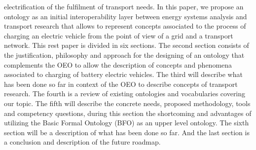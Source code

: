 electrification of the fulfilment of transport needs. In this paper, we propose
an ontology as an initial interoperability layer between energy systems
analysis and transport research that allows to represent concepts associated to
the process of charging an electric vehicle from the point of view of a grid
and a transport network. This rest paper is divided in six sections. The second
section consists of the justification, philosophy and approach for the designing of an ontology that
complements the OEO to allow the description of concepts and phenomena
associated to charging of battery electric vehicles. The third will
describe what has been done so far in context of the OEO to describe concepts
of transport research. The fourth is a review of existing ontologies and
vocabularies covering our topic.  The fifth will describe the concrete needs,
proposed methodology, tools and competency questions, during this section the
shortcoming and advantages of utilizing the Basic Formal Ontology (BFO)
\cite{Arp.2015} as an upper level ontology. The sixth section will be a
description of what has been done so far. And the last section is a conclusion
and description of the future roadmap.

